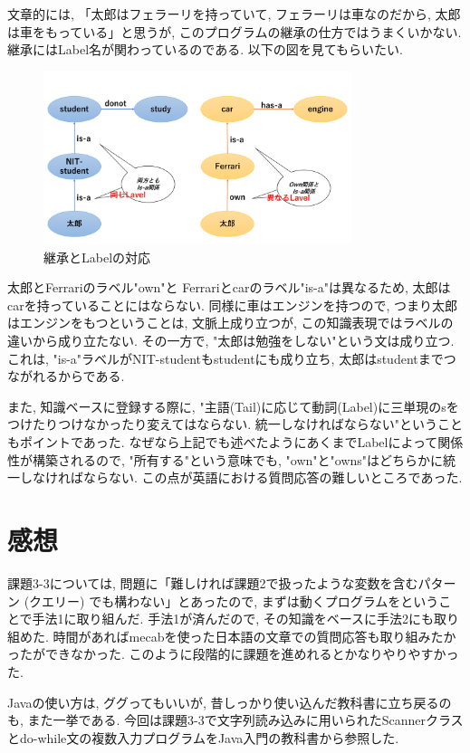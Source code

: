 ﻿\documentclass[uplatex,12pt]{jsarticle}
\begin{document}
文章的には, 「太郎はフェラーリを持っていて, フェラーリは車なのだから, 太郎は車をもっている」と思うが, このプログラムの継承の仕方ではうまくいかない. 継承にはLabel名が関わっているのである. 以下の図を見てもらいたい.
\begin{figure}[htbp]
 \begin{center}
  \includegraphics[width = 9cm, pagebox = cropbox, clip]{継承とLabelの対応.pdf}
 \end{center}
 \caption[]{継承とLabelの対応}\label{fig:fig1.1}
\end{figure}

太郎とFerrariのラベル"own"と Ferrariとcarのラベル"is-a"は異なるため, 太郎はcarを持っていることにはならない. 同様に車はエンジンを持つので, つまり太郎はエンジンをもつということは, 文脈上成り立つが, この知識表現ではラベルの違いから成り立たない. その一方で, "太郎は勉強をしない"という文は成り立つ. これは, "is-a"ラベルがNIT-studentもstudentにも成り立ち, 太郎はstudentまでつながれるからである.

また, 知識ベースに登録する際に, "主語(Tail)に応じて動詞(Label)に三単現のsをつけたりつけなかったり変えてはならない. 統一しなければならない"ということもポイントであった. なぜなら上記でも述べたようにあくまでLabelによって関係性が構築されるので, "所有する"という意味でも, "own"と"owns"はどちらかに統一しなければならない. この点が英語における質問応答の難しいところであった.

\section{感想}
課題3-3については, 問題に「難しければ課題2で扱ったような変数を含むパターン (クエリー) でも構わない」とあったので, まずは動くプログラムをということで手法1に取り組んだ. 手法1が済んだので, その知識をベースに手法2にも取り組めた. 時間があればmecabを使った日本語の文章での質問応答も取り組みたかったができなかった. このように段階的に課題を進めれるとかなりやりやすかった.

Javaの使い方は, ググってもいいが, 昔しっかり使い込んだ教科書に立ち戻るのも, また一挙である. 今回は課題3-3で文字列読み込みに用いられたScannerクラスとdo-while文の複数入力プログラムをJava入門の教科書から参照した.
\end{document}

